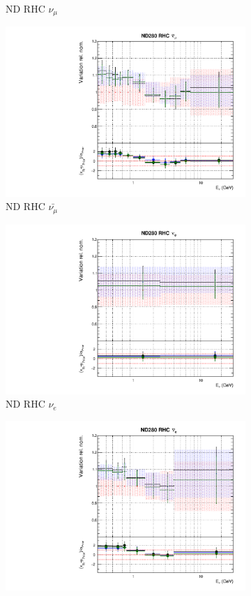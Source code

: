 \begin{figure}
\begin{subfigure}{0.24\textwidth}
  \caption{ND RHC $\nu_{\mu}$}
\end{subfigure}
\begin{subfigure}{0.24\textwidth}
  \centering
  \includegraphics[width=0.95\linewidth]{figs/polyasmvsflux_5}
  \caption{ND RHC $\bar{\nu_{\mu}}$}
\end{subfigure}
\begin{subfigure}{0.24\textwidth}
  \centering
  \includegraphics[width=0.95\linewidth]{figs/polyasmvsflux_6}
  \caption{ND RHC $\nu_{e}$}
\end{subfigure}
\vspace{15mm}
\begin{subfigure}{0.24\textwidth}
  \centering
  \includegraphics[width=0.95\linewidth]{figs/polyasmvsflux_7}

\end{subfigure}
\end{figure}
